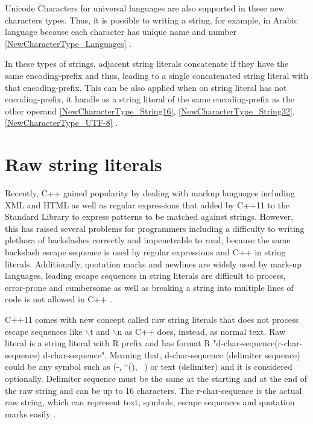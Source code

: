 \documentclass[11pt]{report}
\begin{document}
Unicode Characters for universal languages are also supported in these new characters types. Thus, it is possible to writing a string, for example, in Arabic language because each character has unique name and number \ref{NewCharacterType_Languages} \cite{Josuttis:2012:CppStandardLibrary}.
\newline

In these types of strings, adjacent string literals concatenate if they have the same encoding-prefix and thus, leading to a single concatenated string literal with that encoding-prefix. This can be also applied when on string literal has not encoding-prefix, it handle as a string literal of the same encoding-prefix as the other operand \ref{NewCharacterType_String16}, \ref{NewCharacterType_String32}, \ref{NewCharacterType_UTF-8} \cite{ ISO:2011:Cpplanguage}.


\section{Raw string literals}
\label{section: Raw string literals}
Recently, C++ gained popularity by dealing with markup languages including XML and HTML as well as regular expressions that added by C++11 to the Standard Library to express patterns to be matched against strings. However, this has raised several problems for programmers including a difficulty to writing plethora of backslashes correctly and impenetrable to read, because the same backslash escape sequence is used by regular expressions and C++ in string literals. Additionally, quotation marks and newlines are widely used by mark-up languages, leading escape sequences in string literals are difficult to process, error-prone and cumbersome as well as breaking a string into multiple lines of code is not allowed in C++ \cite{ISO:2011:Cpplanguage}.
\newline

C++11 comes with new concept called raw string literals that does not process escape sequences like $\backslash$t and $\backslash$n as C++ does, instead, as normal text. Raw literal is a string literal with R prefix and has format R "d-char-sequence(r-char-sequence) d-char-sequence". Meaning that, d-char-sequence (delimiter sequence) could be any symbol such as (-, “(), ~) or text (delimiter) and it is considered optionally. Delimiter sequence must be the same at the starting and at the end of the raw string and can be up to 16 characters. The r-char-sequence is the actual raw string, which can represent text, symbols, escape sequences and quotation marks easily \cite{Gregorie:professionalcpp}.
\newline
\end{document}
